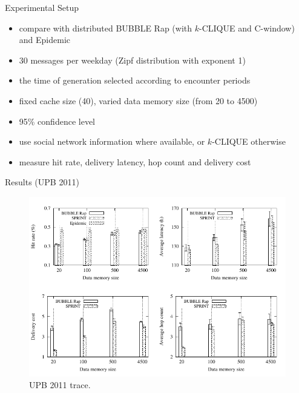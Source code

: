 \documentclass{beamer}
\begin{document}
\begin{frame}{Experimental Setup}
	\begin{itemize}
		\item compare with distributed BUBBLE Rap (with $k$-CLIQUE and C-window) and Epidemic
		\item 30 messages per weekday (Zipf distribution with exponent 1)
		\item the time of generation selected according to encounter periods
		\item fixed cache size (40), varied data memory size (from 20 to 4500)
		\item 95\% confidence level
		\item use social network information where available, or $k$-CLIQUE otherwise
		\item measure hit rate, delivery latency, hop count and delivery cost
	\end{itemize}
\end{frame}


\begin{frame}{Results (UPB 2011)}
	\begin{figure}[!t]
		\centering
		\includegraphics[scale=0.75]{img/upb2011}
		\caption{\label{fig:upb2011}UPB 2011 trace.}
	\end{figure}
\end{frame}
\end{document}
